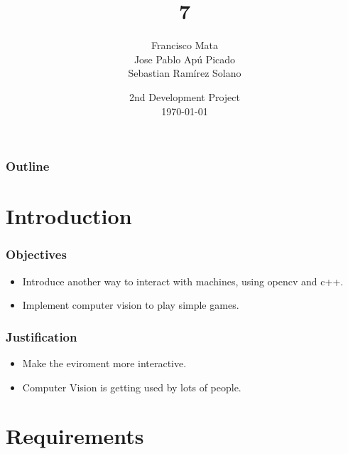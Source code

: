 \documentclass{beamer}
\title[Use of OpenCV to Send Commands]{7}
\author[Jose Pablo Apú - B10407]{
  Francisco Mata\\
  Jose Pablo Apú Picado\\
  Sebastian Ramírez Solano\\\medskip
  }
\institute[University of Costa Rica]{
  Electrical Engineering School \\
  IE-0117 - Programación Bajo Plataformas Abiertas}
\date[\today]{
  2nd Development Project \\
  \today}
\begin{document}
\begin{frame}
  \titlepage
\end{frame}

\begin{frame}
  \frametitle{Outline}
  \tableofcontents
\end{frame}

\section{Introduction}

\begin{frame}
\frametitle{Objectives}
\begin{itemize}
\item Introduce another way to interact with machines, using opencv and c++.
\item Implement computer vision to play simple games.  
\end{itemize}
\end{frame}
\begin{frame}
\frametitle{Justification}
\begin{itemize}
\item Make the eviroment more interactive. 
\item Computer Vision is getting used by lots of people.  
\end{itemize}
\end{frame}
\section{Requirements}
\end{document}
